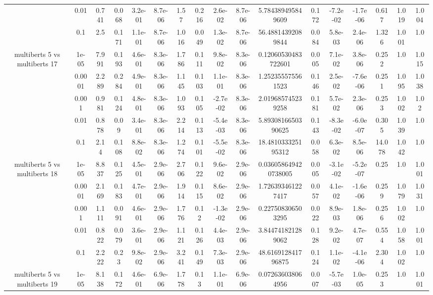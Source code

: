 \begin{tabular}{|c|c|c|c|c|c|c|c|c|c|c|c|c|c|c|c|c|}
 & 0.01 & 0.741 & 0.068 & 3.2e-01 & 8.7e-06 & 1.57 & 0.216 & 2.6e-02 & 8.7e-06 & 5.784389495849609 & 0.172 & -7.2e-02 & -1.7e-06 & 0.617 & 1.019 & 1.004 \\
 & 0.1 & 2.5 & 0.171 & 1.1e-01 & 8.7e-06 & 1.016 & 0.049 & 1.3e-02 & 8.7e-06 & 56.48814392089844 & 0.084 & 5.8e-03 & 2.4e-06 & 1.326 & 1.001 & 1.0 \\
\hline
\multirow{5}{*}{multiberts 5 vs multiberts 17} & 1e-05 & 7.991 & 0.193 & 4.6e-01 & 8.3e-06 & 1.786 & 0.111 & 9.8e-02 & 8.3e-06 & 0.12060530483722601 & 0.005 & 7.1e-02 & 3.8e-06 & 0.252 & 1.0 & 1.015 \\
 & 0.0001 & 2.289 & 0.284 & 4.9e-01 & 8.3e-06 & 1.145 & 0.103 & 1.1e-01 & 8.3e-06 & 1.252355575561523 & 0.146 & 2.5e-02 & -7.6e-06 & 0.251 & 1.095 & 1.038 \\
 & 0.001 & 0.981 & 0.124 & 4.8e-01 & 8.3e-06 & 1.093 & 0.105 & -2.7e-02 & 8.3e-06 & 2.019685745239258 & 0.181 & 5.7e-02 & 2.3e-06 & 0.253 & 1.002 & 1.02 \\
 & 0.01 & 0.878 & 0.09 & 3.4e-01 & 8.3e-06 & 2.214 & 0.113 & -5.4e-03 & 8.3e-06 & 5.8930816650390625 & 0.143 & -8.3e-02 & -6.0e-07 & 0.305 & 1.039 & 1.0 \\
 & 0.1 & 2.14 & 0.108 & 8.8e-02 & 8.3e-06 & 1.274 & 0.101 & -5.5e-02 & 8.3e-06 & 18.481033325195312 & 0.058 & 6.3e-02 & 8.5e-06 & 14.078 & 1.042 & 1.0 \\
\hline
\multirow{5}{*}{multiberts 5 vs multiberts 18} & 1e-05 & 8.837 & 0.125 & 4.5e-01 & 2.9e-06 & 2.706 & 0.122 & 9.6e-02 & 2.9e-06 & 0.036058649420738005 & 0.005 & -3.1e-02 & -5.2e-07 & 0.25 & 1.0 & 1.001 \\
 & 0.0001 & 2.169 & 0.183 & 4.7e-01 & 2.9e-06 & 1.914 & 0.115 & 8.6e-02 & 2.9e-06 & 1.726393461227417 & 0.057 & 4.1e-02 & -1.6e-06 & 0.259 & 1.079 & 1.031 \\
 & 0.001 & 1.111 & 0.091 & 4.6e-01 & 2.9e-06 & 1.776 & 0.12 & -1.3e-02 & 2.9e-06 & 0.227508306503295 & 0.022 & 8.9e-03 & 1.8e-06 & 0.256 & 1.002 & 1.0 \\
 & 0.01 & 0.822 & 0.079 & 3.6e-01 & 2.9e-06 & 1.121 & 0.126 & 4.4e-03 & 2.9e-06 & 3.844741821289062 & 0.128 & 9.2e-02 & 4.7e-07 & 0.554 & 1.058 & 1.001 \\
 & 0.1 & 2.222 & 0.23 & 9.8e-02 & 2.9e-06 & 3.241 & 0.149 & 7.3e-03 & 2.9e-06 & 48.616912841796875 & 0.124 & 1.1e-02 & -4.1e-06 & 2.304 & 1.002 & 1.0 \\
\hline
\multirow{5}{*}{multiberts 5 vs multiberts 19} & 1e-05 & 8.138 & 0.172 & 4.6e-01 & 6.9e-06 & 1.778 & 0.13 & 1.1e-01 & 6.9e-06 & 0.072636038064956 & 0.007 & -5.7e-03 & 1.0e-05 & 0.253 & 1.0 & 1.001 \\

\end{tabular}
